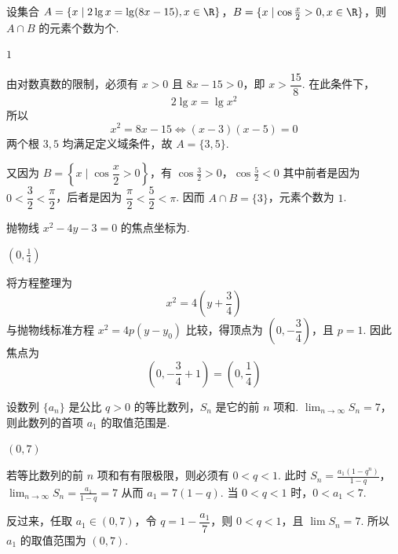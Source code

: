 \begin{problem}
设集合 \(A=\{x\mid 2\lg x=\lg(8x-15),x\in\R\}\)，\(B=\{x\mid \cos\frac{x}{2}>0,x\in\R\}\)，则 \(A\cap B\) 的元素个数为\fillinblank{}\(\text{个}\).
\end{problem}

\begin{answer}
\(1\)
\end{answer}

\begin{solution}
由对数真数的限制，必须有 \(x>0\) 且 \(8x-15>0\)，即 \(x>\dfrac{15}{8}\). 在此条件下，
\[
2\lg x=\lg x^2
\]
所以
\[
x^2=8x-15\Longleftrightarrow (x-3)(x-5)=0
\]
两个根 \(3,5\) 均满足定义域条件，故 \(A=\{3,5\}\).

又因为 \(B=\left\{x\mid\cos\dfrac{x}{2}>0\right\}\)，有
\(\cos\frac{3}{2}>0\)，\(\cos\frac{5}{2}<0\)
其中前者是因为 \(0<\dfrac32<\dfrac\pi2\)，后者是因为 \(\dfrac\pi2<\dfrac52<\pi\). 因而 \(A\cap B=\{3\}\)，元素个数为 \(1\).
\end{solution}

\begin{problem}
抛物线 \(x^2-4y-3=0\) 的焦点坐标为\fillinblank{}.
\end{problem}

\begin{answer}
\(\left(0,\frac{1}{4}\right)\)
\end{answer}

\begin{solution}
将方程整理为
\[
x^2=4\left(y+\frac{3}{4}\right)
\]
与抛物线标准方程 \(x^2=4p(y-y_0)\) 比较，得顶点为 \(\left(0,-\dfrac34\right)\)，且 \(p=1\). 因此焦点为
\[
\left(0,-\frac34+1\right)=\left(0,\frac14\right)
\]
\end{solution}

\begin{problem}
设数列 \(\{a_n\}\) 是公比 \(q>0\) 的等比数列，\(S_n\) 是它的前 \(n\) 项和. \(\displaystyle\lim_{n\to\infty}S_n=7\)，则此数列的首项 \(a_1\) 的取值范围是\fillinblank{}.
\end{problem}

\begin{answer}
\((0,7)\)
\end{answer}

\begin{solution}
若等比数列的前 \(n\) 项和有有限极限，则必须有 \(0<q<1\). 此时
\(S_n=\frac{a_1(1-q^n)}{1-q}\)，\(\lim_{n\to\infty}S_n=\frac{a_1}{1-q}=7\)
从而 \(a_1=7(1-q)\). 当 \(0<q<1\) 时，\(0<a_1<7\).

反过来，任取 \(a_1\in(0,7)\)，令 \(q=1-\dfrac{a_1}{7}\)，则 \(0<q<1\)，且 \(\lim S_n=7\). 所以 \(a_1\) 的取值范围为 \((0,7)\).
\end{solution}


